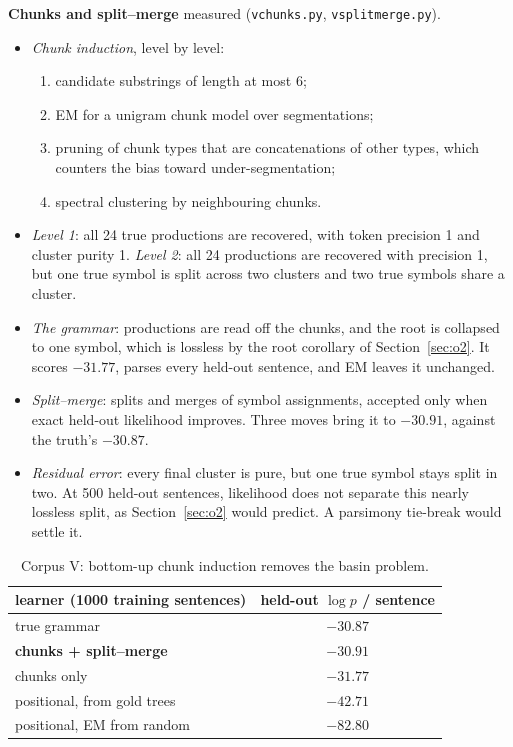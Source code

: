 \documentclass[11pt]{article}
\theoremstyle{definition}
\theoremstyle{remark}
\newcommand{\st}[1]{\textsf{\small\color{gray}#1}}
\begin{document}
\noindent\textbf{Chunks and split--merge} \st{measured} (\texttt{vchunks.py}, \texttt{vsplitmerge.py}).
\begin{itemize}
  \item \emph{Chunk induction}, level by level:
  \begin{enumerate}
    \item candidate substrings of length at most 6;
    \item EM for a unigram chunk model over segmentations;
    \item pruning of chunk types that are concatenations of other types, which counters the bias toward under-segmentation;
    \item spectral clustering by neighbouring chunks.
  \end{enumerate}
  \item \emph{Level 1}: all 24 true productions are recovered, with token precision 1 and cluster purity 1. \emph{Level 2}: all 24 productions are recovered with precision 1, but one true symbol is split across two clusters and two true symbols share a cluster.
  \item \emph{The grammar}: productions are read off the chunks, and the root is collapsed to one symbol, which is lossless by the root corollary of Section~\ref{sec:o2}. It scores $-31.77$, parses every held-out sentence, and EM leaves it unchanged.
  \item \emph{Split--merge}: splits and merges of symbol assignments, accepted only when exact held-out likelihood improves. Three moves bring it to $-30.91$, against the truth's $-30.87$.
  \item \emph{Residual error}: every final cluster is pure, but one true symbol stays split in two. At 500 held-out sentences, likelihood does not separate this nearly lossless split, as Section~\ref{sec:o2} would predict. A parsimony tie-break would settle it.
\end{itemize}
\begin{table}[h]\centering\small
\begin{tabular}{lc}
\toprule
learner (1000 training sentences) & held-out $\log p$ / sentence\\
\midrule
true grammar & $-30.87$\\
\textbf{chunks + split--merge} & $\mathbf{-30.91}$\\
chunks only & $-31.77$\\
positional, from gold trees & $-42.71$\\
positional, EM from random & $-82.80$\\
\bottomrule
\end{tabular}
\caption{Corpus V: bottom-up chunk induction removes the basin problem.}
\end{table}
\end{document}
